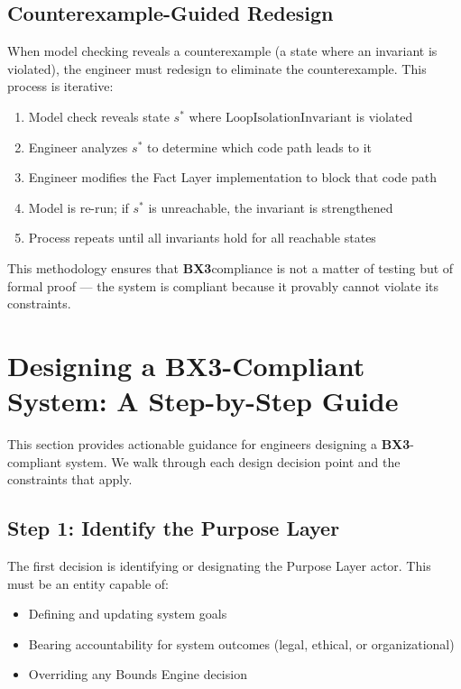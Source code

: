 \documentclass[12pt]{article}
\newcommand{\bxthree}{\textbf{BX3}}
\begin{document}
\subsection{Counterexample-Guided Redesign}
When model checking reveals a counterexample (a state where an invariant is violated), the engineer must redesign to eliminate the counterexample. This process is iterative:

\begin{enumerate}
\item Model check reveals state $s^*$ where $\text{LoopIsolationInvariant}$ is violated
\item Engineer analyzes $s^*$ to determine which code path leads to it
\item Engineer modifies the Fact Layer implementation to block that code path
\item Model is re-run; if $s^*$ is unreachable, the invariant is strengthened
\item Process repeats until all invariants hold for all reachable states
\end{enumerate}

This methodology ensures that \bxthree compliance is not a matter of testing but of formal proof — the system is compliant because it provably cannot violate its constraints.

\section{Designing a BX3-Compliant System: A Step-by-Step Guide}
\label{sec:design-guide}

This section provides actionable guidance for engineers designing a \bxthree-compliant system. We walk through each design decision point and the constraints that apply.

\subsection{Step 1: Identify the Purpose Layer}
The first decision is identifying or designating the Purpose Layer actor. This must be an entity capable of:

\begin{itemize}
\item Defining and updating system goals
\item Bearing accountability for system outcomes (legal, ethical, or organizational)
\item Overriding any Bounds Engine decision
\end{itemize}
\end{document}

